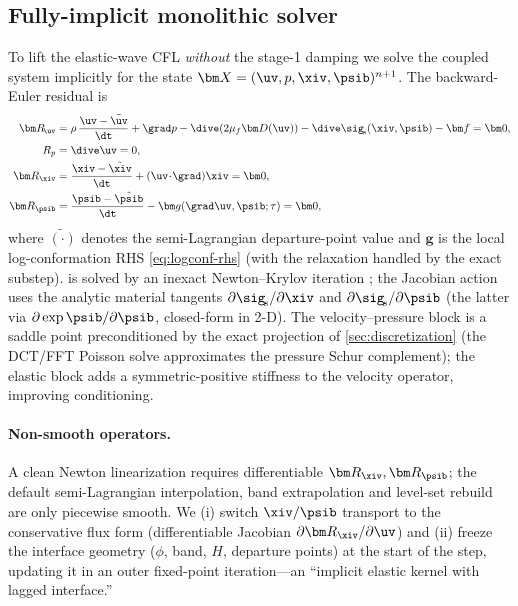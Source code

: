 \subsection{Fully-implicit monolithic solver}
\label{sec:monolithic}
To lift the elastic-wave CFL \emph{without} the stage-1 damping we solve the coupled
system implicitly for the state $\bm X=(\uv,p,\xiv,\psib)^{n+1}$. The backward-Euler
residual is
\begin{subequations}\label{eq:residual}
\begin{align}
\bm R_{\!\uv} &= \rho\,\frac{\uv-\tilde{\uv}}{\dt} + \grad p
   - \dive\!\left(2\mu_f\bm D(\uv)\right) - \dive\sig_{\!s}(\xiv,\psib) - \bm f = \bm 0,\\
R_{p} &= \dive\uv = 0,\\
\bm R_{\xiv} &= \frac{\xiv-\tilde{\xiv}}{\dt} + (\uv\!\cdot\!\grad)\xiv = \bm 0,\\
\bm R_{\psib} &= \frac{\psib-\tilde{\psib}}{\dt} - \bm g(\grad\uv,\psib;\tau) = \bm 0,
\end{align}
\end{subequations}
where $\tilde{(\cdot)}$ denotes the semi-Lagrangian departure-point value and $\bm g$ is
the local log-conformation RHS \cref{eq:logconf-rhs} (with the relaxation handled by the
exact substep).  is solved by an inexact Newton--Krylov iteration
\cite{Knoll2004}; the Jacobian action uses the analytic material tangents
$\partial\sig_{\!s}/\partial\xiv$ and $\partial\sig_{\!s}/\partial\psib$ (the latter via
$\partial\exp\psib/\partial\psib$, closed-form in 2-D). The velocity--pressure block is a
saddle point preconditioned by the exact projection of \cref{sec:discretization} (the
DCT/FFT Poisson solve approximates the pressure Schur complement); the elastic block
adds a symmetric-positive stiffness to the velocity operator, improving conditioning.

\paragraph{Non-smooth operators.} A clean Newton linearization requires differentiable
$\bm R_{\xiv},\bm R_{\psib}$; the default semi-Lagrangian interpolation,
band extrapolation and level-set rebuild are only piecewise smooth. We (i) switch
$\xiv/\psib$ transport to the conservative flux form (differentiable Jacobian
$\partial\bm R_{\xiv}/\partial\uv$) and (ii) freeze the interface geometry
($\phi$, band, $H$, departure points) at the start of the step, updating it in an outer
fixed-point iteration---an ``implicit elastic kernel with lagged interface.''

